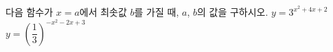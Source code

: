 다음 함수가 $x=a$에서 최솟값 $b$를 가질 때, $a$, $b$의 값을 구하시오.
 $y=3^{x^2+4x+2}$
 $y=\left(\dfrac{1}{3}\right)^{-x^2-2x+3}$
